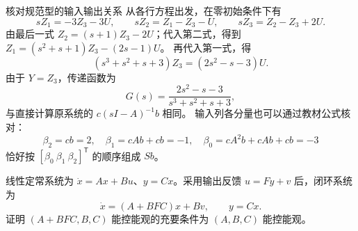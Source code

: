 \documentclass[11pt]{article}
\begin{document}
\begin{solution}
\begin{proofstep}{核对规范型的输入输出关系}
从各行方程出发，在零初始条件下有
\[
sZ_1=-3Z_3-3U,\qquad
sZ_2=Z_1-Z_3-U,\qquad
sZ_3=Z_2-Z_3+2U.
\]
由最后一式 $Z_2=(s+1)Z_3-2U$；代入第二式，得到
$Z_1=(s^2+s+1)Z_3-(2s-1)U$。
再代入第一式，得
\[
(s^3+s^2+s+3)Z_3=(2s^2-s-3)U.
\]
由于 $Y=Z_3$，传递函数为
\[
G(s)=\frac{2s^2-s-3}{s^3+s^2+s+3},
\]
与直接计算原系统的 $c(sI-A)^{-1}b$ 相同。
输入列各分量也可以通过教材公式核对：
\[
\beta_2=cb=2,\quad
\beta_1=cAb+cb=-1,\quad
\beta_0=cA^2b+cAb+cb=-3
\]
恰好按 $[\beta_0\ \beta_1\ \beta_2]^{\mathsf T}$ 的顺序组成 $Sb$。
\end{proofstep}
\end{solution}

\begin{problem}[原题 17]
线性定常系统为 $\dot x=Ax+Bu$、$y=Cx$。采用输出反馈 $u=Fy+v$ 后，闭环系统为
\[
\dot x=(A+BFC)x+Bv,\qquad y=Cx.
\]
证明 $(A+BFC,B,C)$ 能控能观的充要条件为 $(A,B,C)$ 能控能观。
\end{problem}
\end{document}
